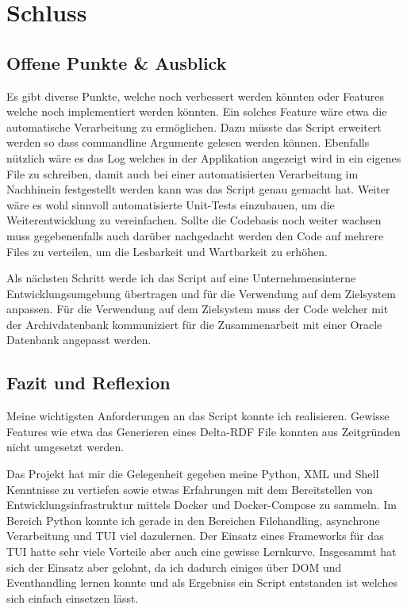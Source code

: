 \documentclass[a4paper,oneside, 12pt]{report}
\begin{document}
\chapter{Schluss}\label{sec:schluss}
\section{Offene Punkte \& Ausblick}
Es gibt diverse Punkte, welche noch verbessert werden könnten oder Features welche noch implementiert werden könnten. Ein solches Feature wäre etwa die automatische Verarbeitung zu ermöglichen. Dazu müsste das Script erweitert werden so dass commandline Argumente gelesen werden können. Ebenfalls nützlich wäre es das Log welches in der Applikation angezeigt wird in ein eigenes File zu schreiben, damit auch bei einer automatisierten Verarbeitung im Nachhinein festgestellt werden kann was das Script genau gemacht hat. Weiter wäre es wohl sinnvoll automatisierte Unit-Tests einzubauen, um die Weiterentwicklung zu vereinfachen. Sollte die Codebasis noch weiter wachsen muss gegebenenfalls auch darüber nachgedacht werden den Code auf mehrere Files zu verteilen, um die Lesbarkeit und Wartbarkeit zu erhöhen.

Als nächsten Schritt werde ich das Script auf eine Unternehmensinterne Entwicklungsumgebung übertragen und für die Verwendung auf dem Zielsystem anpassen. Für die Verwendung auf dem Zielsystem muss der Code welcher mit der Archivdatenbank kommuniziert für die Zusammenarbeit mit einer Oracle Datenbank angepasst werden.

\section{Fazit und Reflexion}
Meine wichtigsten Anforderungen an das Script konnte ich realisieren. Gewisse Features wie etwa das Generieren eines Delta-RDF File konnten aus Zeitgründen nicht umgesetzt werden.

Das Projekt hat mir die Gelegenheit gegeben meine Python, XML und Shell Kenntnisse zu vertiefen sowie etwas Erfahrungen mit dem Bereitstellen von Entwicklungsinfrastruktur mittels Docker und Docker-Compose zu sammeln. Im Bereich Python konnte ich gerade in den Bereichen Filehandling, asynchrone Verarbeitung und \ac{TUI} viel dazulernen. Der Einsatz eines Frameworks für das TUI hatte sehr viele Vorteile aber auch eine gewisse Lernkurve. Insgesammt hat sich der Einsatz aber gelohnt, da ich dadurch einiges über DOM und Eventhandling lernen konnte und als Ergebniss ein Script entstanden ist welches sich einfach einsetzen lässt.
\end{document}
